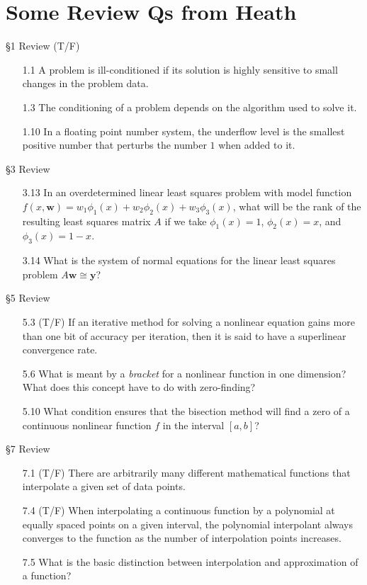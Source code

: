 \documentclass[12pt,letterpaper,noanswers]{exam}
\newcommand{\vc}[1]{\boldsymbol{#1}}
\begin{document}
\section*{Some Review Qs from Heath}
\S 1 Review (T/F)
\begin{enumerate}
    \item[1.1] A problem is ill-conditioned if its solution is highly sensitive to small changes in the problem data.
    \item[1.3] The conditioning of a problem depends on the algorithm used to solve it.
    \item[1.10] In a floating point number system, the underflow level is the smallest positive number that perturbs the number $1$ when added to it.
\end{enumerate}

\noindent \S 3 Review
\begin{enumerate}
    \item[3.13] In an overdetermined linear least squares problem with model function $f(x,\vc{w}) = w_1\phi_1(x) + w_2\phi_2(x) + w_3\phi_3(x)$, what will be the rank of the resulting least squares matrix $A$ if we take $\phi_1(x) = 1$, $\phi_2(x) = x$, and $\phi_3(x) = 1-x$.
    \item[3.14] What is the system of normal equations for the linear least squares problem $A\vc{w}\cong\vc{y}$?
\end{enumerate}

\noindent \S 5 Review
\begin{enumerate}
    \item[5.3] (T/F) If an iterative method for solving a nonlinear equation gains more than one bit of accuracy per iteration, then it is said to have a superlinear convergence rate.
    \item[5.6] What is meant by a \emph{bracket} for a nonlinear function in one dimension?  What does this concept have to do with zero-finding? 
    \item[5.10] What condition ensures that the bisection method will find a zero of a continuous nonlinear function $f$ in the interval $[a,b]$?
\end{enumerate}

\noindent \S 7 Review
\begin{enumerate}
    \item[7.1] (T/F) There are arbitrarily many different mathematical functions that interpolate a given set of data points.
    \item[7.4] (T/F) When interpolating a continuous function by a polynomial at equally spaced points on a given interval, the polynomial interpolant always converges to the function as the number of interpolation points increases.
    \item[7.5] What is the basic distinction between interpolation and approximation of a function?
\end{enumerate}
\end{document}
